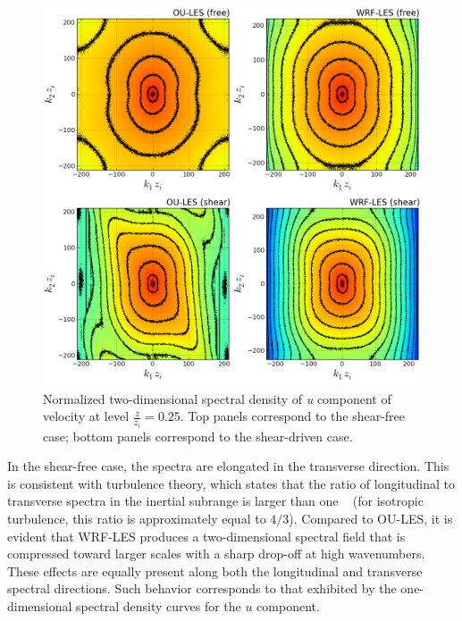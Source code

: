 \begin{figure}[!ht]
\begin{center}
\includegraphics[width=\textwidth]{figures/chapter5/spectra2D_u}
\end{center}
\caption{Normalized two-dimensional spectral density of \textit{u} component of velocity at level $\frac{z}{z_i}=0.25$. Top panels correspond to the shear-free case; bottom panels correspond to the shear-driven case.}
\label{figure506}
\end{figure}


In the shear-free case, the spectra are elongated in the transverse direction. This is consistent with turbulence theory, which states that the ratio of longitudinal to transverse spectra in the inertial subrange is larger than one ~\citep{TenLum1972} (for isotropic turbulence, this ratio is approximately equal to $4/3$). Compared to OU-LES, it is evident that WRF-LES produces a two-dimensional spectral field that is compressed toward larger scales with a sharp drop-off at high wavenumbers. These effects are equally present along both the longitudinal and transverse spectral directions. Such behavior corresponds to that exhibited by the one-dimensional spectral density curves for the $u$ component.

